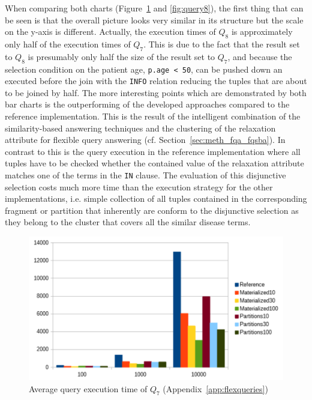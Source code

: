 When comparing both charts (Figure~\ref{fig:query7} and \ref{fig:query8}), the first thing that can be seen is that the overall picture looks very similar in its
structure but the scale on the y-axis is different. Actually, the execution times of $Q_8$ is approximately only half of the execution times of $Q_7$. This is
due to the fact that the result set to $Q_8$ is presumably only half the size of the result set to $Q_7$, and because the selection condition on the patient age,
\verb!p.age < 50!, can be pushed down an executed before the join with the \verb!INFO! relation reducing the tuples that are about to be joined by half. The more
interesting points which are demonstrated by both bar charts is the outperforming of the developed approaches compared to the reference implementation. This is
the result of the intelligent combination of the similarity-based answering techniques and the clustering of the relaxation attribute for flexible query answering
(cf. Section~\ref{sec:meth_fqa_fqsba}). In contrast to this is the query execution in the reference implementation where all tuples have to be checked whether
the contained value of the relaxation attribute matches one of the terms in the \verb!IN! clause. The evaluation of this disjunctive selection costs much more 
time than the execution strategy for the other implementations, i.e. simple collection of all tuples contained in the corresponding fragment or partition that 
inherently are conform to the disjunctive selection as they belong to the cluster that covers all the similar disease terms. 

\begin{figure}[h]
    \centering
    \includegraphics[scale=0.75]{charts/Query7.pdf}
    \caption{Average query execution time of $Q_7$ (Appendix~\ref{app:flexqueries})}
    \label{fig:query7}
\end{figure}

